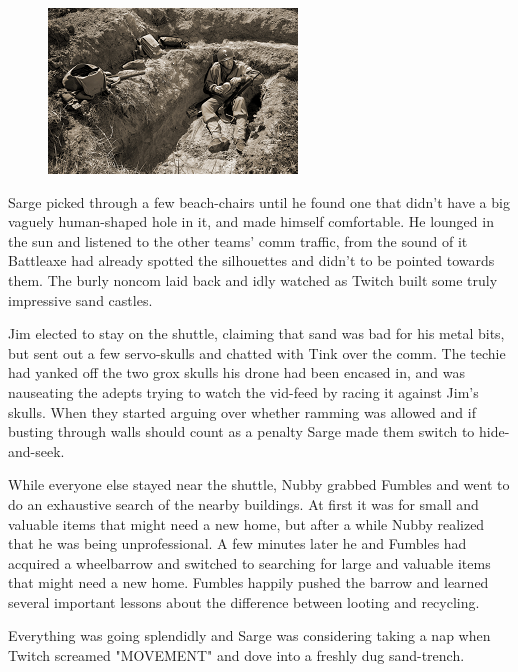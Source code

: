 \begin{figure}
	\begin{center}
		\includegraphics[width=\figwidth]{pics/11/16.png}
	\end{center}
\end{figure}
Sarge picked through a few beach-chairs until he found one that didn't have a big vaguely human-shaped hole in it, and made himself comfortable. 
He lounged in the sun and listened to the other teams' comm traffic, from the sound of it Battleaxe had already spotted the silhouettes and didn't to be pointed towards them. 
The burly noncom laid back and idly watched as Twitch built some truly impressive sand castles.

Jim elected to stay on the shuttle, claiming that sand was bad for his metal bits, but sent out a few servo-skulls and chatted with Tink over the comm. 
The techie had yanked off the two grox skulls his drone had been encased in, and was nauseating the adepts trying to watch the vid-feed by racing it against Jim's skulls. 
When they started arguing over whether ramming was allowed and if busting through walls should count as a penalty Sarge made them switch to hide-and-seek.

While everyone else stayed near the shuttle, Nubby grabbed Fumbles and went to do an exhaustive search of the nearby buildings. 
At first it was for small and valuable items that might need a new home, but after a while Nubby realized that he was being unprofessional. 
A few minutes later he and Fumbles had acquired a wheelbarrow and switched to searching for large and valuable items that might need a new home. 
Fumbles happily pushed the barrow and learned several important lessons about the difference between looting and recycling.

Everything was going splendidly and Sarge was considering taking a nap when Twitch screamed "MOVEMENT" and dove into a freshly dug sand-trench.

